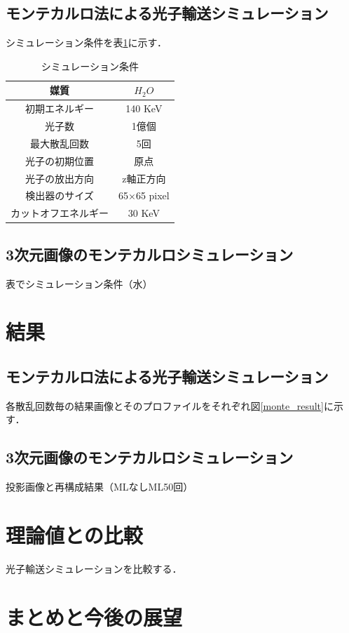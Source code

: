 \documentclass[dvipdfmx,autodetect-engine,twocolumn,10pt]{jsarticle}%
\begin{document}
\subsection{モンテカルロ法による光子輸送シミュレーション}
シミュレーション条件を表\ref{simu_cond}に示す．
\begin{table}[htb]
  \begin{center}
    \caption{シミュレーション条件}
    \label{simu_cond}
    \begin{tabular}{|c|c|} \hline
      媒質 & $H_2O$ \\ \hline
      初期エネルギー & 140 KeV \\ \hline
      光子数 & 1億個 \\ \hline
      最大散乱回数 & 5回 \\ \hline
      光子の初期位置 & 原点 \\ \hline
      光子の放出方向 & z軸正方向 \\ \hline
      検出器のサイズ & 65×65 pixel \\ \hline
      カットオフエネルギー & 30 KeV \\ \hline
    \end{tabular}
  \end{center}
\end{table}
\subsection{3次元画像のモンテカルロシミュレーション}
表でシミュレーション条件（水）

\section{結果}
\subsection{モンテカルロ法による光子輸送シミュレーション}
各散乱回数毎の結果画像とそのプロファイルをそれぞれ図\ref{monte_result}に示す．

\subsection{3次元画像のモンテカルロシミュレーション}
投影画像と再構成結果（MLなしML50回）

\section{理論値との比較}
光子輸送シミュレーションを比較する．

\section{まとめと今後の展望}
\end{document}
